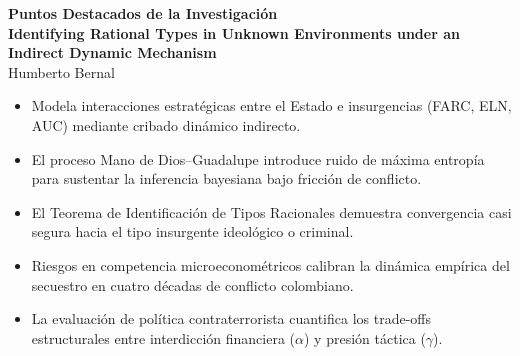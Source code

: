 \documentclass[12pt]{article}
\begin{document}
\doublespacing

\begin{center}
\textbf{Puntos Destacados de la Investigación} \\
\vspace{1em}
\textbf{Identifying Rational Types in Unknown Environments under an Indirect Dynamic Mechanism} \\
Humberto Bernal
\end{center}

\vspace{2em}

\begin{itemize}
    \item Modela interacciones estratégicas entre el Estado e insurgencias (FARC, ELN, AUC) mediante cribado dinámico indirecto.
    \item El proceso Mano de Dios--Guadalupe introduce ruido de máxima entropía para sustentar la inferencia bayesiana bajo fricción de conflicto.
    \item El Teorema de Identificación de Tipos Racionales demuestra convergencia casi segura hacia el tipo insurgente ideológico o criminal.
    \item Riesgos en competencia microeconométricos calibran la dinámica empírica del secuestro en cuatro décadas de conflicto colombiano.
    \item La evaluación de política contraterrorista cuantifica los trade-offs estructurales entre interdicción financiera ($\alpha$) y presión táctica ($\gamma$).
\end{itemize}
\end{document}
